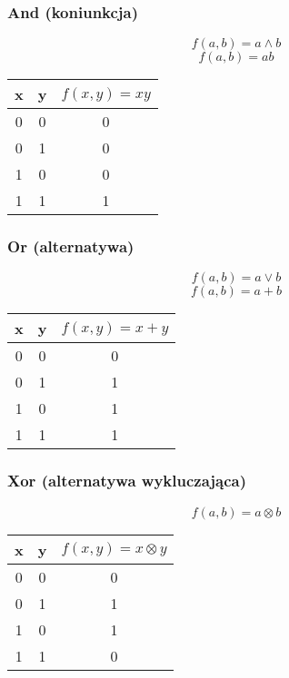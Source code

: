 \begin{multicols}{2}
\subsubsection{And (koniunkcja)}
\[f(a,b) = a \land b\]
\[f(a,b) = ab\]
\begin{center}
    \begin{tabular}{| c  c | c |}
        \hline
        x & y & $f(x,y) = xy$ \\ 
        \hline
        0 & 0 & 0 \\ 
        0 & 1 & 0 \\ 
        1 & 0 & 0 \\ 
        1 & 1 & 1 \\ 
        \hline 
    \end{tabular}
\end{center}
\subsubsection{Or (alternatywa)}
\[f(a,b) = a \lor b\]
\[f(a,b) = a + b\]
\begin{center}
    \begin{tabular}{| c  c | c |}
        \hline
        x & y & $f(x,y) = x + y$ \\ 
        \hline
        0 & 0 & 0 \\ 
        0 & 1 & 1 \\ 
        1 & 0 & 1 \\ 
        1 & 1 & 1 \\ 
        \hline 
    \end{tabular}
\end{center}
\end{multicols}
\begin{paracol}{2}
\subsubsection{Xor (alternatywa wykluczająca)}
\[f(a,b) = a \otimes b\]
\begin{center}
    \begin{tabular}{| c  c | c |}
        \hline
        x & y & $f(x,y) = x \otimes y$ \\ 
        \hline
        0 & 0 & 0 \\ 
        0 & 1 & 1 \\ 
        1 & 0 & 1 \\ 
        1 & 1 & 0 \\ 
        \hline 
    \end{tabular}
\end{center}
\switchcolumn
\vfill{}
\end{paracol}
